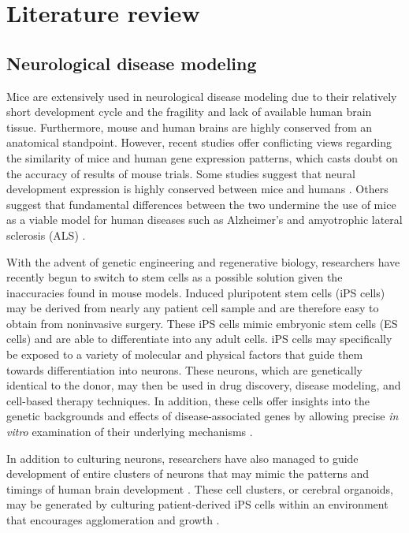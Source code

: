 \documentclass[12pt,oneside,onecolumn,a4paper]{article}
\begin{document}
\section{Literature review}

\subsection{Neurological disease modeling}

Mice are extensively used in neurological disease modeling due to their relatively short development cycle and the fragility and lack of available human brain tissue. Furthermore, mouse and human brains are highly conserved from an anatomical standpoint. However, recent studies offer conflicting views regarding the similarity of mice and human gene expression patterns, which casts doubt on the accuracy of results of mouse trials. Some studies suggest that neural development expression is highly conserved between mice and humans \citep{Lin_2014}. Others suggest that fundamental differences between the two undermine the use of mice as a viable model for human diseases such as Alzheimer's and amyotrophic lateral sclerosis (ALS) \citep{Burns_2015}.

With the advent of genetic engineering and regenerative biology, researchers have recently begun to switch to stem cells as a possible solution given the inaccuracies found in mouse models. Induced pluripotent stem cells
(iPS cells) may be derived from nearly any patient cell sample and are therefore easy to obtain from noninvasive surgery. These iPS cells mimic embryonic stem cells (ES cells) and are able to differentiate into any adult cells. iPS cells may specifically be exposed to a variety of molecular and physical factors that guide them towards differentiation into neurons. These neurons, which are genetically identical to the donor, may then be used in drug discovery, disease modeling, and cell-based therapy techniques. In addition, these cells offer insights into the genetic backgrounds and effects of disease-associated genes by allowing precise \textit{in vitro} examination of their underlying mechanisms \citep{Imaizumi2014ModelingHN}.

In addition to culturing neurons, researchers have also managed to guide development of entire clusters of neurons that may mimic the patterns and timings of human brain development \citep{Lancaster_2014}. These cell clusters, or cerebral organoids, may be generated by culturing patient-derived iPS cells within an environment that encourages agglomeration and growth \citep{nguyen_wang_nikolakopoulou_2015}. 
\end{document}

